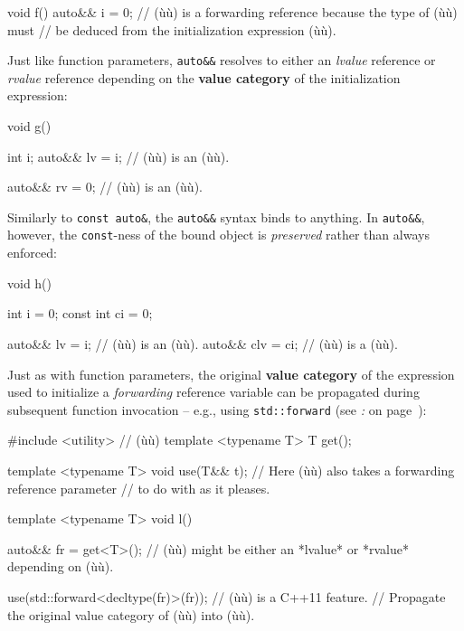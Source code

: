 \begin{emcppslisting}
void f()
{
    auto&& i = 0;  // (ù{}ù) is a forwarding reference because the type of (ù{}ù) must
                   // be deduced from the initialization expression (ù{}ù).
}
\end{emcppslisting}

\noindent Just like function parameters, \texttt{auto\&\&} resolves to either an
\emph{lvalue} reference or \emph{rvalue} reference depending on the
\textbf{value category} of the initialization expression:

\begin{emcppslisting}
void g()
{
    int i;
    auto&& lv = i;  // (ù{}ù) is an (ù{}ù).

    auto&& rv = 0;  // (ù{}ù) is an (ù{}ù).
}
\end{emcppslisting}

\noindent Similarly to \texttt{const}~\texttt{auto\&}, the \texttt{auto\&\&}
syntax binds to anything. In \texttt{auto\&\&}, however, the
\texttt{const}-ness of the bound object is \emph{preserved} rather than
always enforced:

\begin{emcppslisting}
void h()
{
    int        i = 0;
    const int ci = 0;

    auto&& lv  = i;   // (ù{}ù) is an (ù{}ù).
    auto&& clv = ci;  // (ù{}ù) is a (ù{}ù).
}
\end{emcppslisting}

\noindent Just as with function parameters, the original \textbf{value category}
of the expression used to initialize a \emph{forwarding} reference
variable can be propagated during subsequent function invocation --
e.g., using \texttt{std::forward} (see \textit{: } on page~\pageref{the-std::forward-utility}):

\begin{emcppshiddenlisting}[emcppsbatch=e5]
#include <utility>  // (ù{}ù)
template <typename T>
T get();
\end{emcppshiddenlisting}
\begin{emcppslisting}[emcppsbatch=e5]
template <typename T>
void use(T&& t); // Here (ù{}ù) also takes a forwarding reference parameter
                 // to do with as it pleases.

template <typename T>
void l()
{
    auto&& fr = get<T>();
        // (ù{}ù) might be either an *lvalue* or *rvalue* depending on (ù{}ù).

    use(std::forward<decltype(fr)>(fr));  // (ù{}ù) is a C++11 feature.
        // Propagate the original value category of (ù{}ù) into (ù{}ù).
}
\end{emcppslisting}

